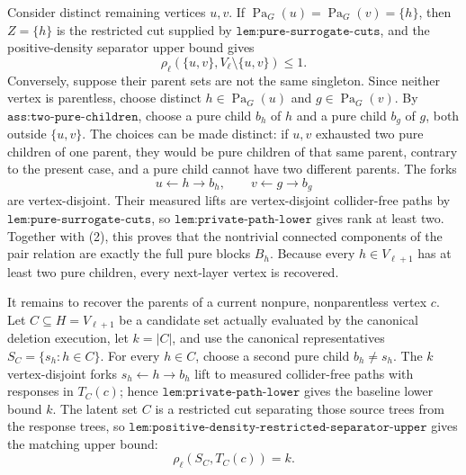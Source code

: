 Consider distinct remaining vertices \(u,v\).  If \(\operatorname{Pa}_G(u)=\operatorname{Pa}_G(v)=\{h\}\), then \(Z=\{h\}\) is the restricted cut supplied by \(\texttt{lem:pure-surrogate-cuts}\), and the positive-density separator upper bound gives
\[
 \rho_\ell(\{u,v\},V_\ell\setminus\{u,v\})\leq1. \tag{2}
\]
Conversely, suppose their parent sets are not the same singleton.  Since neither vertex is parentless, choose distinct \(h\in\operatorname{Pa}_G(u)\) and \(g\in\operatorname{Pa}_G(v)\).  By \(\texttt{ass:two-pure-children}\), choose a pure child \(b_h\) of \(h\) and a pure child \(b_g\) of \(g\), both outside \(\{u,v\}\).  The choices can be made distinct: if \(u,v\) exhausted two pure children of one parent, they would be pure children of that same parent, contrary to the present case, and a pure child cannot have two different parents.  The forks
\[
 u\leftarrow h\to b_h,
 \qquad
 v\leftarrow g\to b_g
\]
are vertex-disjoint.  Their measured lifts are vertex-disjoint collider-free paths by \(\texttt{lem:pure-surrogate-cuts}\), so \(\texttt{lem:private-path-lower}\) gives rank at least two.  Together with (2), this proves that the nontrivial connected components of the pair relation are exactly the full pure blocks \(B_h\).  Because every \(h\in V_{\ell+1}\) has at least two pure children, every next-layer vertex is recovered.

It remains to recover the parents of a current nonpure, nonparentless vertex \(c\).  Let \(C\subseteq H=V_{\ell+1}\) be a candidate set actually evaluated by the canonical deletion execution, let \(k=|C|\), and use the canonical representatives \(S_C=\{s_h:h\in C\}\).  For every \(h\in C\), choose a second pure child \(b_h\neq s_h\).  The \(k\) vertex-disjoint forks \(s_h\leftarrow h\to b_h\) lift to measured collider-free paths with responses in \(T_C(c)\); hence \(\texttt{lem:private-path-lower}\) gives the baseline lower bound \(k\).  The latent set \(C\) is a restricted cut separating those source trees from the response trees, so \(\texttt{lem:positive-density-restricted-separator-upper}\) gives the matching upper bound:
\[
 \rho_\ell(S_C,T_C(c))=k. \tag{3}
\]


